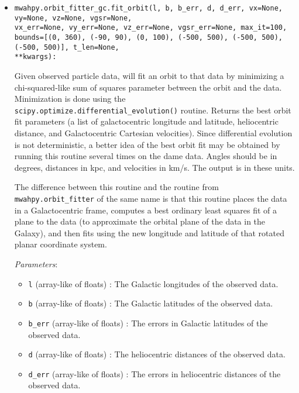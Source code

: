 \documentclass{article}
\begin{document}
\begin{itemize}

\item \verb!mwahpy.orbit_fitter_gc.fit_orbit(l, b, b_err, d, d_err, vx=None, vy=None, vz=None, vgsr=None,!\\ \verb!vx_err=None, vy_err=None, vz_err=None, vgsr_err=None, max_it=100,!\\ \verb!bounds=[(0, 360), (-90, 90), (0, 100), (-500, 500), (-500, 500), (-500, 500)], t_len=None,!\\ \verb!**kwargs):!

Given observed particle data, will fit an orbit to that data by minimizing a chi-squared-like sum of squares parameter between the orbit and the data. Minimization is done using the \\ \verb!scipy.optimize.differential_evolution()! routine.  Returns the best orbit fit parameters (a list of galactocentric longitude and latitude, heliocentric distance, and Galactocentric Cartesian velocities). Since differential evolution is not deterministic, a better idea of the best orbit fit may be obtained by running this routine several times on the dame data. Angles should be in degrees, distances in kpc, and velocities in km/s. The output is in these units. 

The difference between this routine and the routine from \verb!mwahpy.orbit_fitter! of the same name is that this routine places the data in a Galactocentric frame, computes a best ordinary least squares fit of a plane to the data (to approximate the orbital plane of the data in the Galaxy), and then fits using the new longitude and latitude of that rotated planar coordinate system.

\textit{Parameters}: \begin{itemize}

\item \verb!l! (array-like of floats) : The Galactic longitudes of the observed data. 

\item \verb!b! (array-like of floats) : The Galactic latitudes of the observed data. 

\item \verb!b_err! (array-like of floats) : The errors in Galactic latitudes of the observed data. 

\item \verb!d! (array-like of floats) : The heliocentric distances of the observed data. 

\item \verb!d_err! (array-like of floats) : The errors in heliocentric distances of the observed data. 


\end{itemize}
\end{itemize}
\end{document}
